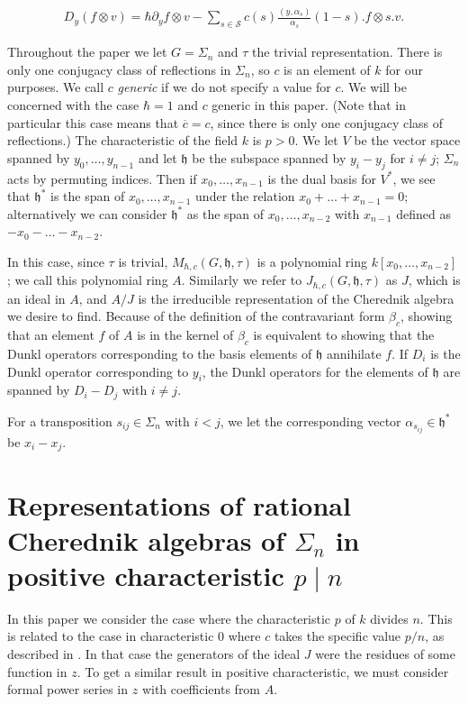 \documentclass{article}
\numberwithin{equation}{section}
\newcommand{\h}{\mathfrak{h}}
\begin{document}
\begin{align*}
D_y(f \otimes v) = \hbar \partial_y f \otimes v - \sum_{s \in \mathcal{S}} c(s) \frac{ ( y, \alpha_s )}{\alpha_s} (1-s). f \otimes s.v.
\end{align*}



Throughout the paper we let $G=\Sigma_n$ and $\tau$ the trivial representation. There is only one conjugacy class of reflections in $\Sigma_n$, so $c$ is an element of $k$ for our purposes. We call $c$ {\it generic} if we do not specify a value for $c$. We will be concerned with the case $\hbar=1$ and $c$ generic in this paper. (Note that in particular this case means that $\overline{c}=c$, since there is only one conjugacy class of reflections.) The characteristic of the field $k$ is $p>0$. We let $V$ be the vector space spanned by $y_0,\dots,y_{n-1}$ and let $\h$ be the subspace spanned by $y_i-y_j$ for $i \ne j$; $\Sigma_n$ acts by permuting indices. Then if $x_0,\dots,x_{n-1}$ is the dual basis for $V^*$, we see that $\h^*$ is the span of $x_0,\dots,x_{n-1}$ under the relation $x_0+\dots+x_{n-1}=0$; alternatively we can consider $\h^*$ as the span of $x_0,\dots,x_{n-2}$ with $x_{n-1}$ defined as $-x_0-\dots-x_{n-2}$. 

In this case, since $\tau$ is trivial, $M_{\hbar,c}(G,\h,\tau)$ is a polynomial ring $k[x_0,\dots,x_{n-2}]$; we call this polynomial ring $A$. Similarly we refer to $J_{\hbar,c}(G,\h,\tau)$ as $J$, which is an ideal in $A$, and $A/J$ is the irreducible representation of the Cherednik algebra we desire to find. Because of the definition of the contravariant form $\beta_c$, showing that an element $f$ of $A$ is in the kernel of $\beta_c$ is equivalent to showing that the Dunkl operators corresponding to the basis elements of $\h$ annihilate $f$. If $D_i$ is the Dunkl operator corresponding to $y_i$, the Dunkl operators for the elements of $\h$ are spanned by $D_i-D_j$ with $i \ne j$. 

For a transposition $s_{ij} \in \Sigma_n$ with $i<j$, we let the corresponding vector $\alpha_{s_{ij}} \in \h^*$ be $x_i-x_j$.


\section{Representations of rational Cherednik algebras of $\Sigma_n$ in positive characteristic $p \mid n$}

In this paper we consider the case where the characteristic $p$ of $k$ divides $n$. This is related to the case in characteristic $0$ where $c$ takes the specific value $p/n$, as described in \cite{CE}. In that case the generators of the ideal $J$ were the residues of some function in $z$. To get a similar result in positive characteristic, we must consider formal power series in $z$ with coefficients from $A$. 
\end{document}
